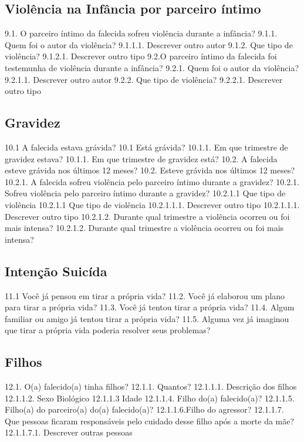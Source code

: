 \subsection{Violência na Infância por parceiro íntimo}

9.1. O parceiro íntimo da falecida sofreu violência durante a infância?
9.1.1. Quem foi o autor da violência?
9.1.1.1. Descrever outro autor
9.1.2. Que tipo de violência?
9.1.2.1. Descrever outro tipo
9.2.O parceiro íntimo da falecida foi testemunha de violência durante a infância?
9.2.1. Quem foi o autor da violência?
9.2.1.1. Descrever outro autor
9.2.2. Que tipo de violência?
9.2.2.1. Descrever outro tipo

\subsection{Gravidez}

10.1 A falecida estava grávida?	10.1 Está grávida?
10.1.1. Em que trimestre de gravidez estava?	10.1.1. Em que trimestre de gravidez está?
10.2. A falecida esteve grávida nos últimos 12 meses?	10.2. Esteve grávida nos últimos 12 meses?
10.2.1. A falecida sofreu violência pelo parceiro íntimo durante a gravidez?	10.2.1. Sofreu violência pelo parceiro íntimo durante a gravidez?
10.2.1.1 Que tipo de violência	10.2.1.1 Que tipo de violência
10.2.1.1.1. Descrever outro tipo	10.2.1.1.1. Descrever outro tipo
10.2.1.2. Durante qual trimestre a violência ocorreu ou foi mais intensa?	10.2.1.2. Durante qual trimestre a violência ocorreu ou foi mais intensa?

\subsection{Intenção Suicída}

11.1 Você já pensou em tirar a própria vida?
11.2. Você já elaborou um plano para tirar a própria vida?
11.3. Você já tentou tirar a própria vida?
11.4. Algum familiar ou amigo já tentou tirar a própria vida?
11.5. Alguma vez já imaginou que tirar a própria vida poderia resolver seus problemas?

\subsection{Filhos}

12.1. O(a) falecido(a) tinha filhos?
12.1.1. Quantos?
12.1.1.1. Descrição dos filhos
12.1.1.2. Sexo Biológico
12.1.1.3 Idade
12.1.1.4. Filho do(a) falecido(a)?
12.1.1.5. Filho(a) do parceiro(a) do(a) falecido(a)?
12.1.1.6.Filho do agressor?
12.1.1.7. Que pessoas ficaram responsáveis pelo cuidado desse filho após a morte da mãe?
12.1.1.7.1. Descrever outras pessoas

